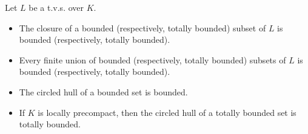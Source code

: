 Let $L$ be a t.v.s. over $K$.

\begin{itemize}
  \item[(i)] The closure of a bounded (respectively, totally bounded) subset of $L$ is bounded (respectively, totally bounded).
  \item[(ii)] Every finite union of bounded (respectively, totally bounded) subsets of $L$ is bounded (respectively, totally bounded).
  \item[(iii)] The circled hull of a bounded set is bounded.
  \item[(iv)] If $K$ is locally precompact, then the circled hull of a totally bounded set is totally bounded.
\end{itemize}
